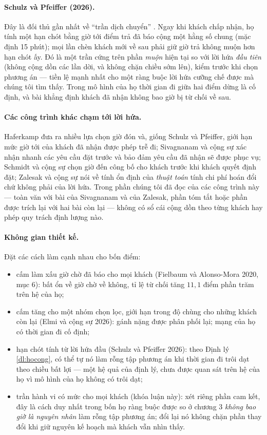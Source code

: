 \paragraph{Schulz và Pfeiffer (2026).} Đây là đối thủ gần nhất về ``trần dịch chuyển''
\cite{schulz2026}. Ngay khi khách chấp nhận, họ tính một hạn chót bằng giờ tới điểm trả đã báo
cộng một hằng số chung (mặc định 15 phút); mọi lần chèn khách mới về sau phải giữ giờ trả không
muộn hơn hạn chót ấy. Đó là một trần cứng trên phần \emph{muộn} hiện tại so với lời hứa \emph{đầu
tiên} (không cộng dồn các lần dời, và không chặn chiều sớm lên), kiểm trước khi chọn phương án --- tiền lệ mạnh nhất cho một ràng buộc lời hứa cưỡng chế được mà
chúng tôi tìm thấy. Trong mô hình của họ thời gian đi giữa hai điểm dừng là cố định, và bài khẳng
định khách đã nhận không bao giờ bị từ chối về sau.

\paragraph{Các công trình khác chạm tới lời hứa.} Haferkamp \cite{haferkamp2024} đưa ra nhiều lựa
chọn giờ đón và, giống Schulz và Pfeiffer, giới hạn mức giờ tới của khách đã nhận được phép trễ
đi; Sivagnanam và cộng sự \cite{sivagnanam2026} xác nhận nhanh các yêu cầu đặt trước và bảo đảm
yêu cầu đã nhận sẽ được phục vụ; Schmidt và cộng sự \cite{schmidt2026} chọn giờ đến công bố cho
khách trước khi khách quyết định đặt; Zalesak và cộng sự \cite{zalesak2025} nói về tính ổn định
của \emph{thuật toán} tính chi phí hoán đổi chứ không phải của lời hứa. Trong phần chúng tôi đã
đọc của các công trình này --- toàn văn với bài của Sivagnanam và của Zalesak, phần tóm tắt hoặc
phần được trích lại với hai bài còn lại --- không có sổ cái cộng dồn theo từng khách hay phép quy
trách định lượng nào.

\paragraph{Không gian thiết kế.} Đặt các cách làm cạnh nhau cho bốn điểm:
\begin{itemize}[leftmargin=1.2cm,itemsep=2pt,topsep=3pt]
\item cấm làm xấu giờ chờ đã báo cho mọi khách (Fielbaum và Alonso-Mora 2020, mục 6): bất ổn
về giờ chờ về không, tỉ lệ từ chối tăng $11{,}1$ điểm phần trăm trên hệ của họ;
\item cấm tăng cho một nhóm chọn lọc, giới hạn trong độ chùng cho những khách còn lại (Elmi và
cộng sự 2026): gánh nặng được phân phối lại; mạng của họ có thời gian đi cố định;
\item hạn chót tính từ lời hứa đầu (Schulz và Pfeiffer 2026): theo Định lý \ref{dl:hocong}, có
thể tự nó làm rỗng tập phương án khi thời gian đi trôi dạt theo chiều bất lợi --- một hệ quả của
định lý, chưa được quan sát trên hệ của họ vì mô hình của họ không có trôi dạt;
\item trần hành vi có mức cho mọi khách (khóa luận này): xét riêng phần cam kết, đây là cách duy
nhất trong bốn họ ràng buộc được so ở chương 3 \emph{không bao giờ là nguyên nhân} làm rỗng tập
phương án; đổi lại nó không chặn phần thay đổi khi giữ nguyên kế hoạch mà khách vẫn nhìn thấy.
\end{itemize}

